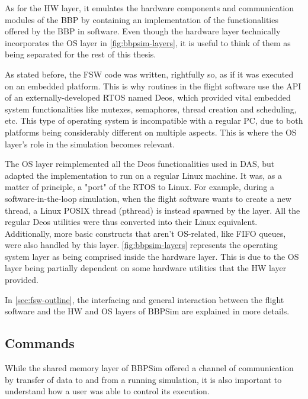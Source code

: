 {As for the HW layer, it emulates the hardware components and communication modules of the BBP by containing an implementation of the functionalities offered by the BBP in software. Even though the hardware layer technically incorporates the OS layer in \autoref{fig:bbpsim-layers}, it is useful to think of them as being separated for the rest of this thesis.

As stated before, the FSW code was written, rightfully so, as if it was executed on an embedded platform. This is why routines in the flight software use the API of an externally-developed \gls{RTOS} named Deos, which provided vital embedded system functionalities like mutexes, semaphores, thread creation and scheduling, etc. This type of operating system is incompatible with a regular PC, due to both platforms being considerably different on multiple aspects. This is where the OS layer's role in the simulation becomes relevant. 

The OS layer reimplemented all the Deos functionalities used in DAS, but adapted the implementation to run on a regular Linux machine. It was, as a matter of principle, a "port" of the RTOS to Linux. For example, during a software-in-the-loop simulation, when the flight software wants to create a new thread, a Linux POSIX thread (pthread) is instead spawned by the layer. All the regular Deos utilities were thus converted into their Linux equivalent. Additionally, more basic constructs that aren't OS-related, like FIFO queues, were also handled by this layer. \autoref{fig:bbpsim-layers} represents the operating system layer as being comprised inside the hardware layer. This is due to the OS layer being partially dependent on some hardware utilities that the HW layer provided.

In \autoref{sec:fsw-outline}, the interfacing and general interaction between the flight software and the HW and OS layers of BBPSim are explained in more details.

\subsection*{Commands}
While the shared memory layer of BBPSim offered a channel of communication by transfer of data to and from a running simulation, it is also important to understand how a user was able to control its execution. 

}
